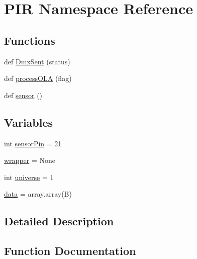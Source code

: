 \hypertarget{namespacePIR}{}\section{P\+IR Namespace Reference}
\label{namespacePIR}
\subsection*{Functions}
\begin{DoxyCompactItemize}
\item 
def \hyperlink{namespacePIR_a3ac8568113a155231b15ea38bf802371}{Dmx\+Sent} (status)
\item 
def \hyperlink{namespacePIR_a73b3e8262186dd13e1241f48eb9c4870}{process\+O\+LA} (flag)
\item 
def \hyperlink{namespacePIR_a4004ed7a5eb2d52ce539fffd7b6db672}{sensor} ()
\end{DoxyCompactItemize}
\subsection*{Variables}
\begin{DoxyCompactItemize}
\item 
int \hyperlink{namespacePIR_a65a96d98ec0e9ec25e91c0dcee16a613}{sensor\+Pin} = 21
\item 
\hyperlink{namespacePIR_a20f17a4234d94696dd7e9474ae30bb23}{wrapper} = None
\item 
int \hyperlink{namespacePIR_a7db1cd298280d11c130c963a2181665f}{universe} = 1
\item 
\hyperlink{namespacePIR_aafc26dea0dec5027c9733ee5f828f40c}{data} = array.\+array(\textquotesingle{}B\textquotesingle{})
\end{DoxyCompactItemize}


\subsection{Detailed Description}
 

\subsection{Function Documentation}
\mbox{\label{namespacePIR_a3ac8568113a155231b15ea38bf802371}} 
